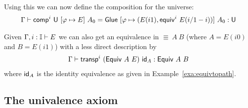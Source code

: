 
\medskip

Using this we can now define the composition for the universe:
\[
\Gamma \vdash {\sf comp}^i~\mathsf{U}~[\varphi\mapsto E]~A_0 =
{\sf Glue}~[\varphi\mapsto(E(i1),{\sf equiv}^i~E(i/1-i))]~A_0 : \mathsf{U}
\]

\begin{remark*}
  Given $\Gamma, i : \mathbb{I} \vdash E$ we can also get an equivalence in
  $\Equiv~A~B$ (where $A = E (i0)$ and $B = E(i1)$) with a less direct
  description by
  \[
  \Gamma \vdash \operatorname{\mathsf{transp}}^i~({\sf Equiv}~A~E)~{\sf id}_A : {\sf Equiv}~A~B
  \]
  where ${\sf id}_A$ is the identity equivalence as given in
  Example~\ref{exa:equivtopath}.
\end{remark*}


\subsection{The univalence axiom}
\label{sec:univalence-axiom}

